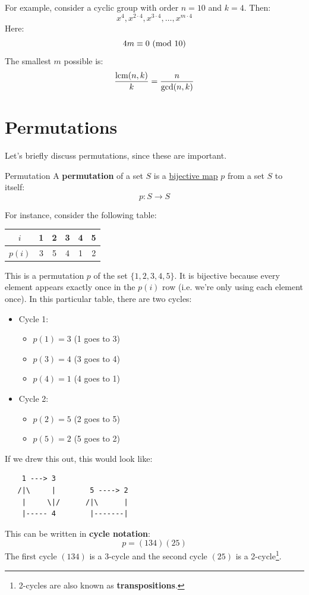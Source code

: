 \documentclass[letterpaper]{article}
\begin{document}
For example, consider a cyclic group with order $n = 10$ and $k = 4$. Then: 
\[x^4, x^{2 \cdot 4}, x^{3 \cdot 4}, \dots, x^{m \cdot 4}\]
Here: 
\[4m \equiv 0 \ (\mathrm{mod}\ 10)\]
The smallest $m$ possible is: 
\[\frac{\operatorname{lcm}(n, k)}{k} = \frac{n}{\gcd(n, k)}\]










\newpage 
\section{Permutations}
Let's briefly discuss permutations, since these are important.
\begin{definition}{Permutation}{}
    A \textbf{permutation} of a set $S$ is a \underline{bijective map} $p$ from a set $S$ to itself: 
    \[p: S \to S\]
\end{definition}
For instance, consider the following table: 
\begin{center}
    \begin{tabular}{|c|c c c c c|}
        \hline 
        $i$ & 1 & 2 & 3 & 4 & 5 \\ 
        \hline 
        $p(i)$ & 3 & 5 & 4 & 1 & 2 \\ 
        \hline 
    \end{tabular}
\end{center}
This is a permutation $p$ of the set $\{1, 2, 3, 4, 5\}$. It is bijective because every element appears exactly once in the $p(i)$ row (i.e. we're only using each element once). In this particular table, there are two cycles:
\begin{itemize}
    \item Cycle 1: 
    \begin{itemize}
        \item $p(1) = 3$ (1 goes to 3)
        \item $p(3) = 4$ (3 goes to 4)
        \item $p(4) = 1$ (4 goes to 1)
    \end{itemize}
    \item Cycle 2: 
    \begin{itemize}
        \item $p(2) = 5$ (2 goes to 5)
        \item $p(5) = 2$ (5 goes to 2)
    \end{itemize}
\end{itemize}
If we drew this out, this would look like: 
\begin{verbatim}
    1 ---> 3
   /|\     |        5 ----> 2
    |     \|/      /|\      |
    |----- 4        |-------|
\end{verbatim}
This can be written in \textbf{cycle notation}:
\[p = (1 3 4)(2 5)\]
The first cycle $(1 3 4)$ is a 3-cycle and the second cycle $(2 5)$ is a 2-cycle\footnote{2-cycles are also known as \textbf{transpositions}.}.
\end{document}

